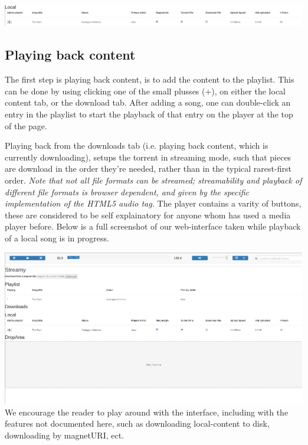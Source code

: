 \includegraphics[width=\linewidth]{gfx/local-info}

\subsection{Playing back content}
The first step is playing back content, is to add the content to the playlist.
This can be done by using clicking one of the small plusses (+), on either the
local content tab, or the download tab.
\newline
After adding a song, one can double-click an entry in the playlist to start the
playback of that entry on the player at the top of the page.

Playing back from the downloads tab (i.e. playing back content, which is
currently downloading), setups the torrent in streaming mode, such that pieces
are download in the order they're needed, rather than in the typical
rarest-first order.
{\em Note that not all file formats can be streamed; streamability and playback
of different file formats is browser dependent, and given by the specific
implementation of the \acs{HTML}5 audio tag.}
\newline\newline
The player contains a varity of buttons, these are considered to be self
explainatory for anyone whom has used a media player before. Below is a full
screenshot of our web-interface taken while playback of a local song is in
progress.

\includegraphics[width=\linewidth]{gfx/interface}
\newline
We encourage the reader to play around with the interface, including with the
features not documented here, such as downloading local-content to disk,
downloading by magnetURI, ect.
